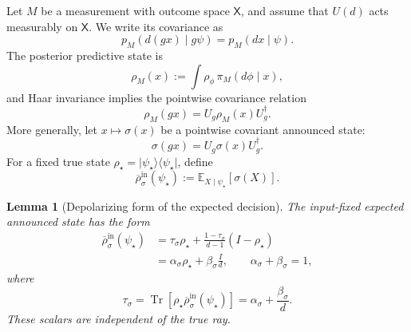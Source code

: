 \documentclass[journal]{IEEEtran}
\newtheorem{lemma}[theorem]{Lemma}
\newcommand{\ket}[1]{\lvert #1\rangle}
\newcommand{\bra}[1]{\langle #1\rvert}
\begin{document}
Let \(M\) be a measurement with outcome space \(\mathsf X\), and assume that
\(U(d)\) acts measurably on \(\mathsf X\).  We write its covariance as
\begin{equation}
    p_M(d(gx)\mid g\psi)=p_M(dx\mid\psi).
    \label{eq:covariant_observation_model_expected_decision}
\end{equation}
The posterior predictive state is
\begin{equation}
    \rho_M(x)
    :=
    \int \rho_\phi\,\pi_M(d\phi\mid x),
    \label{eq:posterior_state_covariant_decision_section}
\end{equation}
and Haar invariance implies the pointwise covariance relation
\begin{equation}
    \rho_M(gx)=U_g\rho_M(x)U_g^\dagger.
    \label{eq:posterior_state_pointwise_covariance}
\end{equation}
More generally, let \(x\mapsto\sigma(x)\) be a pointwise covariant announced
state:
\begin{equation}
    \sigma(gx)=U_g\sigma(x)U_g^\dagger.
    \label{eq:pointwise_covariant_decision_rule}
\end{equation}
For a fixed true state
\(\rho_\star=\ket{\psi_\star}\bra{\psi_\star}\), define
\begin{equation}
    \overline\rho_{\sigma}^{\mathrm{in}}(\psi_\star)
    :=
    \mathbb E_{X\mid\psi_\star}[\sigma(X)].
    \label{eq:expected_announced_state_fixed_input}
\end{equation}

\begin{lemma}[Depolarizing form of the expected decision]
\label{lem:depolarizing_form_expectation_general}
The input-fixed expected announced state has the form
\begin{equation}
\begin{split}
    \overline\rho_{\sigma}^{\mathrm{in}}(\psi_\star)
    &=
    \tau_\sigma\rho_\star
    +
    \frac{1-\tau_\sigma}{d-1}(I-\rho_\star)                                    \\
    &=
    \alpha_\sigma\rho_\star
    +
    \beta_\sigma\frac{I}{d},
    \qquad
    \alpha_\sigma+\beta_\sigma=1,
\end{split}
\label{eq:expected_decision_two_depolarizing_parameterizations}
\end{equation}
where
\begin{equation}
    \tau_\sigma
    =
    \operatorname{Tr}\!\left[
       \rho_\star\overline\rho_{\sigma}^{\mathrm{in}}(\psi_\star)
    \right]
    =
    \alpha_\sigma+\frac{\beta_\sigma}{d}.
    \label{eq:expected_decision_tau_definition_local}
\end{equation}
These scalars are independent of the true ray.
\end{lemma}
\end{document}
